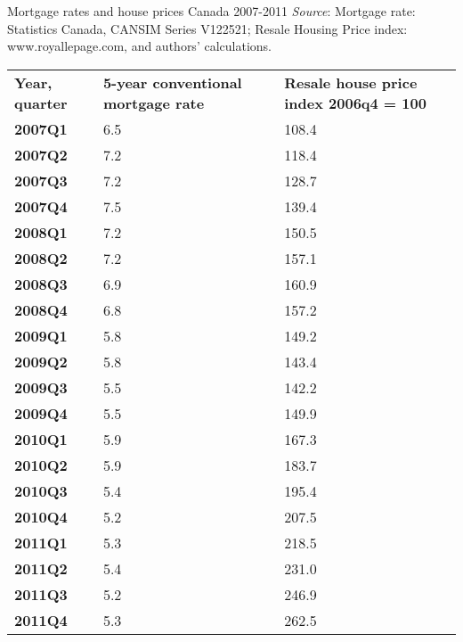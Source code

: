 \begin{Table}{25em}{Mortgage rates and house prices Canada 2007-2011 \label{table:mortratehousepricecanada}}{\textit{Source}: Mortgage rate: Statistics Canada, CANSIM Series V122521; Resale Housing Price index: www.royallepage.com, and authors' calculations.}
\begin{tabu} to 35em {|X[1,c]X[1,c]X[1,c]|} \hline 
{}\textbf{Year, quarter} & \textbf{5-year conventional mortgage rate} & \textbf{Resale house price index 2006q4 = 100} \\
						\textbf{2007Q1} & 6.5 & 108.4 \\
	\textbf{2007Q2} & 7.2 & 118.4 \\ 
						\textbf{2007Q3} & 7.2 & 128.7 \\ 
	\textbf{2007Q4} & 7.5 & 139.4 \\
						\textbf{2008Q1} & 7.2 & 150.5 \\
	\textbf{2008Q2} & 7.2 & 157.1 \\
						\textbf{2008Q3} & 6.9 & 160.9 \\
	\textbf{2008Q4} & 6.8 & 157.2 \\
						\textbf{2009Q1} & 5.8 & 149.2 \\ 
	\textbf{2009Q2} & 5.8 & 143.4 \\ 
						\textbf{2009Q3} & 5.5 & 142.2 \\
	\textbf{2009Q4} & 5.5 & 149.9 \\
						\textbf{2010Q1} & 5.9 & 167.3 \\
	\textbf{2010Q2} & 5.9 & 183.7 \\ 
						\textbf{2010Q3} & 5.4 & 195.4 \\
	\textbf{2010Q4} & 5.2 & 207.5 \\
						\textbf{2011Q1} & 5.3 & 218.5 \\
	\textbf{2011Q2} & 5.4 & 231.0 \\
						\textbf{2011Q3} & 5.2 & 246.9 \\
	\textbf{2011Q4} & 5.3 & 262.5 \\ \hline 
\end{tabu}
\end{Table}

